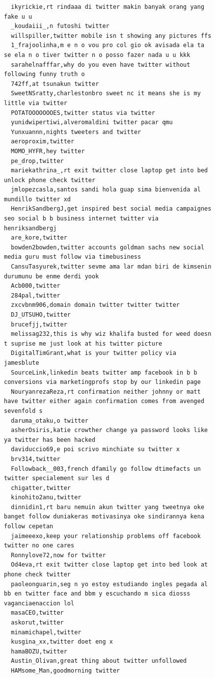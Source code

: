 \begin{figure}[htpb]
\begin{verbatim}
  ikyrickie,rt rindaaa di twitter makin banyak orang yang fake u u
  _koudaiii_,n futoshi twitter
  willspiller,twitter mobile isn t showing any pictures ffs
  1_frajoolinha,m e n o vou pro col gio ok avisada ela ta se ela n o tiver twitter n o posso fazer nada u u kkk
  sarahelnafffar,why do you even have twitter without following funny truth o
  742ff,at tsunakun twitter
  SweetNSratty,charlestonbro sweet nc it means she is my little via twitter
  POTATOOOOOOOES,twitter status via twitter
  yunidwipertiwi,alveromaldini twitter pacar qmu
  Yunxuannn,nights tweeters and twitter
  aeroproxim,twitter
  MOMO_HYFR,hey twitter
  pe_drop,twitter
  mariekathrina_,rt exit twitter close laptop get into bed unlock phone check twitter
  jmlopezcasla,santos sandi hola guap sima bienvenida al mundillo twitter xd
  HenrikSandbergJ,get inspired best social media campaignes seo social b b business internet twitter via henriksandbergj
  are_kore,twitter
  bowden2bowden,twitter accounts goldman sachs new social media guru must follow via timebusiness
  CansuTasyurek,twitter sevme ama lar mdan biri de kimsenin durumunu be enme derdi yook
  Acb000,twitter
  284pal,twitter
  zxcvbnm906,domain domain twitter twitter twitter
  DJ_UTSUHO,twitter
  brucefjj,twitter
  melissag232,this is why wiz khalifa busted for weed doesn t suprise me just look at his twitter picture
  DigitalTimGrant,what is your twitter policy via jamesblute
  SourceLink,linkedin beats twitter amp facebook in b b conversions via marketingprofs stop by our linkedin page
  NouryanrezaReza,rt confirmation neither johnny or matt have twitter either again confirmation comes from avenged sevenfold s
  daruma_otaku,o twitter
  asherOsiris,katie crowther change ya password looks like ya twitter has been hacked
  daviduccio69,e poi scrivo minchiate su twitter x
  brv314,twitter
  Followback__003,french dfamily go follow dtimefacts un twitter specialement sur les d
  chigatter,twitter
  kinohito2anu,twitter
  dinnidin1,rt baru nemuin akun twitter yang tweetnya oke banget follow duniakeras motivasinya oke sindirannya kena follow cepetan
  jaimeeexo,keep your relationship problems off facebook twitter no one cares
  Ronnylove72,now for twitter
  Od4eva,rt exit twitter close laptop get into bed look at phone check twitter
  paoleonguarin,seg n yo estoy estudiando ingles pegada al bb en twitter face and bbm y escuchando m sica diosss vaganciaenaccion lol
  masaCEO,twitter
  askorut,twitter
  minamichapel,twitter
  kusgina_xx,twitter doet eng x
  hamaBOZU,twitter
  Austin_Olivan,great thing about twitter unfollowed
  HAMsome_Man,goodmorning twitter

\end{verbatim}
\end{figure}
